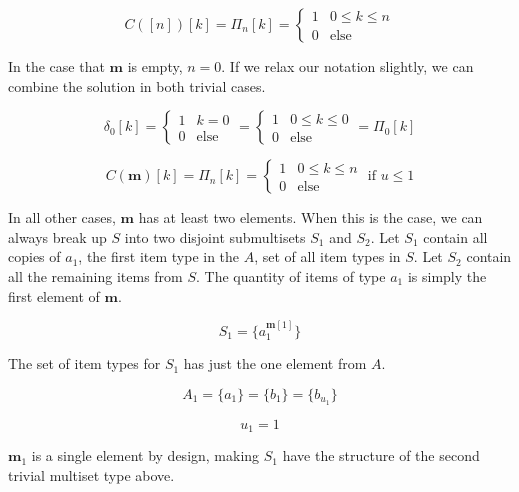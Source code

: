 \documentclass{article}
\begin{document}
\begin{equation}
    C([n])[k] = \Pi_n[k] = \begin{cases}1 & 0 \leq k \leq n \\ 0 & \text{else}  \end{cases}
\end{equation}

In the case that $\bm{m}$ is empty, $n=0$. If we relax our notation slightly, we can combine the solution in both trivial cases.

\begin{equation}
    \delta_0[k] = \begin{cases}1 & k = 0 \\ 0 & \text{else}  \end{cases} = \begin{cases}1 & 0 \leq k \leq 0 \\ 0 & \text{else}  \end{cases} = \Pi_0[k]
\end{equation}

\begin{equation}
    C(\bm{m})[k] = \Pi_n[k] = \begin{cases}1 & 0 \leq k \leq n \\ 0 & \text{else}  \end{cases}\text{ if } u\leq 1
\end{equation}

In all other cases, $\bm{m}$ has at least two elements. When this is the case, we can always break up $S$ into two disjoint submultisets $S_1$ and $S_2$. Let $S_1$ contain all copies of $a_1$, the first item type in the $A$, set of all item types in $S$. Let $S_2$ contain all the remaining items from $S$. The quantity of items of type $a_1$ is simply the first element of $\bm{m}$.

\begin{equation}
    S_1 = \{a_1 ^ {\bm{m}[1]}\} 
\end{equation}

The set of item types for $S_1$ has just the one element from $A$.

\begin{equation}
    A_1 = \{a_1\} = \{b_1\} = \{b_{u_1}\}
\end{equation}

\begin{equation}
    u_1 = 1
\end{equation}

$\bm{m}_1$ is a single element by design, making $S_1$ have the structure of the second trivial multiset type above.
\end{document}
